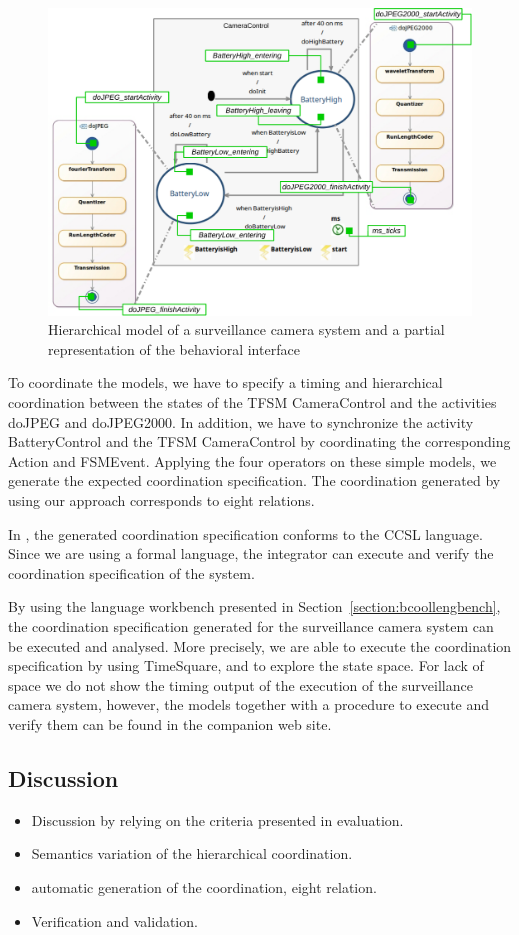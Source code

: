 	\begin{figure}
		\center
		\includegraphics[width=.7\columnwidth]{examples/figs/picmodels.pdf}
		\caption{Hierarchical model of a surveillance camera system and a partial representation of the behavioral interface}
		\label{fig:camerasystem}
	\end{figure}
	
	To coordinate the models, we have to specify a timing and hierarchical coordination between the states of the TFSM CameraControl and the activities doJPEG and doJPEG2000. In addition, we have to synchronize the activity BatteryControl and the TFSM CameraControl by coordinating the corresponding Action and FSMEvent. Applying the four operators on these simple models, we generate the expected coordination specification. The coordination generated by using our approach corresponds to eight \ccsl relations.
	 
	In \bcool, the generated coordination specification conforms to the CCSL language. Since we are using a formal language, the integrator can execute and verify the coordination specification of the system.
	
	By using the language workbench presented in Section~\ref{section:bcoollengbench}, the coordination specification generated for the surveillance camera system can be executed and analysed. More precisely, we are able to execute the coordination specification by using TimeSquare, and to explore the state space. For lack of space we do not show the timing output of the execution of the surveillance camera system, however, the models together with a procedure to execute and verify them can be found in the companion web site.
	
	\subsection{Discussion}
	
	\begin{itemize}
		\item Discussion by relying on the criteria presented in evaluation.
		\item Semantics variation of the hierarchical coordination. 
		\item automatic generation of the coordination, eight relation.
		\item Verification and validation. 
	\end{itemize}